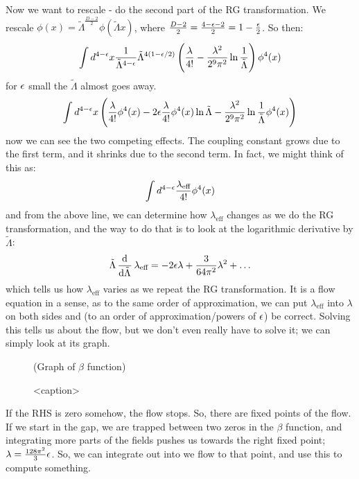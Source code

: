 Now we want to rescale - do the second part of the RG transformation. We rescale $\phi(x) = \tilde{\Lambda}^{\frac{D - 2}{2}}\phi(\tilde{\Lambda} x)$, where $\frac{D - 2}{2} = \frac{4 - \epsilon - 2}{2} = 1 - \frac{\epsilon}{2}$. So then:
\begin{equation}
    \int d^{4-\e}x \frac{1}{\tilde{\Lambda}^{4-\e}} \tilde{\Lambda}^{4(1-\e/2)}\left(\frac{\lambda}{4!} - \frac{\lambda^2}{2^9\pi^2}\ln\frac{1}{\tilde{\Lambda}}\right)\phi^4(x)
\end{equation}
for $\epsilon$ small the $\tilde{\Lambda}$ almost goes away.
\begin{equation}
    \int d^{4-\e}x \left(\frac{\lambda}{4!}\phi^4(x) - 2\e \frac{\lambda}{4!}\phi^4(x)\ln \tilde{\Lambda}  - \frac{\lambda^2}{2^9\pi^2}\ln\frac{1}{\tilde{\Lambda}}\phi^4(x)\right)
\end{equation}
now we can see the two competing effects. The coupling constant grows due to the first term, and it shrinks due to the second term. In fact, we might think of this as:
\begin{equation}
    \int d^{4-\e}\frac{\lambda_{\text{eff}}}{4!}\phi^4(x)
\end{equation}
and from the above line, we can determine how $\lambda_{\text{eff}}$ changes as we do the RG transformation, and the way to do that is to look at the logarithmic derivative by $\tilde{\Lambda}$:
\begin{equation}
    \tilde{\Lambda}\dod{}{\tilde{\Lambda}}\lambda_{\text{eff}} = -2\e\lambda + \frac{3}{64\pi^2}\lambda^2 + \ldots 
\end{equation}
which tells us how $\lambda_{\text{eff}}$ varies as we repeat the RG transformation. It is a flow equation in a sense, as to the same order of approximation, we can put $\lambda_{\text{eff}}$ into $\lambda$ on both sides and (to an order of approximation/powers of $\epsilon$) be correct. Solving this tells us about the flow, but we don't even really have to solve it; we can simply look at its graph.

\begin{figure}[htbp]
    \centering
    (Graph of $\beta$ function)
    \caption{<caption>}
    \label{<label>}
\end{figure}

If the RHS is zero somehow, the flow stops. So, there are fixed points of the flow. If we start in the gap, we are trapped between two zeros in the $\beta$ function, and integrating more parts of the fields pushes us towards the right fixed point; $\lambda = \frac{128\pi^2}{3}\epsilon$. So, we can integrate out into we flow to that point, and use this to compute something.

